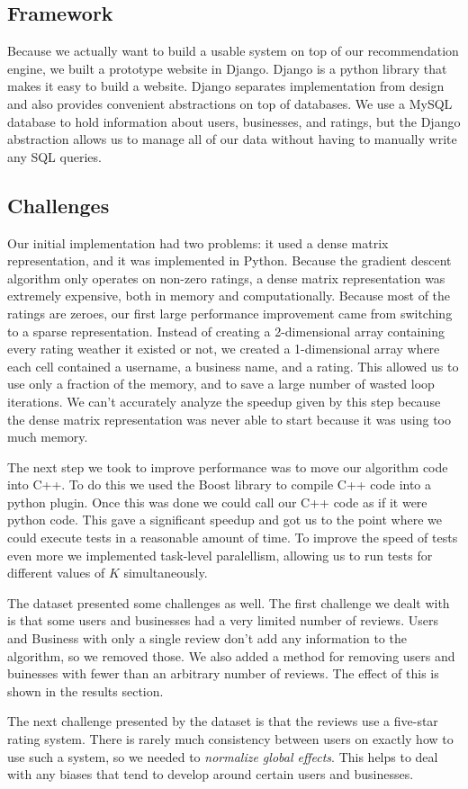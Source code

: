 \subsection{Framework}

Because we actually want to build a usable system on top of our recommendation
engine, we built a prototype website in Django. Django is a python library that
makes it easy to build a website. Django separates implementation from design
and also provides convenient abstractions on top of databases. We use a MySQL
database to hold information about users, businesses, and ratings, but the
Django abstraction allows us to manage all of our data without having to
manually write any SQL queries.

\subsection{Challenges}

Our initial implementation had two problems: it used a dense matrix
representation, and it was implemented in Python. Because the gradient descent
algorithm only operates on non-zero ratings, a dense matrix representation was
extremely expensive, both in memory and computationally. Because most of the
ratings are zeroes, our first large performance improvement came from switching
to a sparse representation. Instead of creating a 2-dimensional array containing
every rating weather it existed or not, we created a 1-dimensional array where
each cell contained a username, a business name, and a rating. This allowed us
to use only a fraction of the memory, and to save a large number of wasted loop
iterations. We can't accurately analyze the speedup given by this step because
the dense matrix representation was never able to start because it was using too
much memory. 

The next step we took to improve performance was to move our algorithm code into
C++. To do this we used the Boost library to compile C++ code into a python
plugin. Once this was done we could call our C++ code as if it were python code.
This gave a significant speedup and got us to the point where we could execute
tests in a reasonable amount of time. To improve the speed of tests even more we
implemented task-level paralellism, allowing us to run tests for different
values of $K$ simultaneously.

The dataset presented some challenges as well. The first challenge we dealt with
is that some users and businesses had a very limited number of reviews. Users
and Business with only a single review don't add any information to the
algorithm, so we removed those. We also added a method for removing users and
buinesses with fewer than an arbitrary number of reviews. The effect of this is
shown in the results section.

The next challenge presented by the dataset is that the reviews use a five-star
rating system. There is rarely much consistency between users on exactly how to
use such a system, so we needed to \emph{normalize global effects}. This helps
to deal with any biases that tend to develop around certain users and
businesses. 
